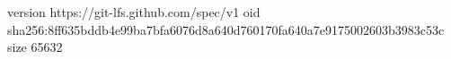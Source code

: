 version https://git-lfs.github.com/spec/v1
oid sha256:8ff635bddb4e99ba7bfa6076d8a640d760170fa640a7e9175002603b3983c53c
size 65632
